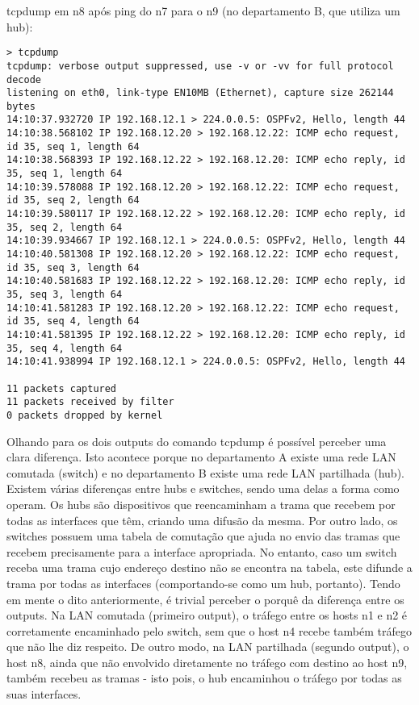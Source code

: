 \documentclass{article}
\begin{document}
\noindent tcpdump em n8 após ping do n7 para o n9 (no departamento B, que utiliza um hub):
\begin{lstlisting}
> tcpdump
tcpdump: verbose output suppressed, use -v or -vv for full protocol decode
listening on eth0, link-type EN10MB (Ethernet), capture size 262144 bytes
14:10:37.932720 IP 192.168.12.1 > 224.0.0.5: OSPFv2, Hello, length 44
14:10:38.568102 IP 192.168.12.20 > 192.168.12.22: ICMP echo request, id 35, seq 1, length 64
14:10:38.568393 IP 192.168.12.22 > 192.168.12.20: ICMP echo reply, id 35, seq 1, length 64
14:10:39.578088 IP 192.168.12.20 > 192.168.12.22: ICMP echo request, id 35, seq 2, length 64
14:10:39.580117 IP 192.168.12.22 > 192.168.12.20: ICMP echo reply, id 35, seq 2, length 64
14:10:39.934667 IP 192.168.12.1 > 224.0.0.5: OSPFv2, Hello, length 44
14:10:40.581308 IP 192.168.12.20 > 192.168.12.22: ICMP echo request, id 35, seq 3, length 64
14:10:40.581683 IP 192.168.12.22 > 192.168.12.20: ICMP echo reply, id 35, seq 3, length 64
14:10:41.581283 IP 192.168.12.20 > 192.168.12.22: ICMP echo request, id 35, seq 4, length 64
14:10:41.581395 IP 192.168.12.22 > 192.168.12.20: ICMP echo reply, id 35, seq 4, length 64
14:10:41.938994 IP 192.168.12.1 > 224.0.0.5: OSPFv2, Hello, length 44

11 packets captured
11 packets received by filter
0 packets dropped by kernel
\end{lstlisting}

\noindent Olhando para os dois outputs do comando tcpdump é possível perceber uma clara diferença. Isto acontece porque no departamento A existe uma rede LAN comutada (switch) e no departamento B existe uma rede LAN partilhada (hub). 
Existem várias diferenças entre hubs e switches, sendo uma delas a forma como operam. Os hubs são dispositivos que reencaminham a trama que recebem por todas as interfaces que têm, criando uma difusão da mesma. Por outro lado, os switches possuem uma tabela de comutação que ajuda no envio das tramas que recebem precisamente para a interface apropriada. No entanto, caso um switch receba uma trama cujo endereço destino não se encontra na tabela, este difunde a trama por todas as interfaces (comportando-se como um hub, portanto).
Tendo em mente o dito anteriormente, é trivial perceber o porquê da diferença entre os outputs. Na LAN comutada (primeiro output), o tráfego entre os hosts n1 e n2 é corretamente encaminhado pelo switch, sem que o host n4 recebe também tráfego que não lhe diz respeito. De outro modo, na LAN partilhada (segundo output), o host n8, ainda que não envolvido diretamente no tráfego com destino ao host n9, também recebeu as tramas - isto pois, o hub encaminhou o tráfego por todas as suas interfaces.
\end{document}
